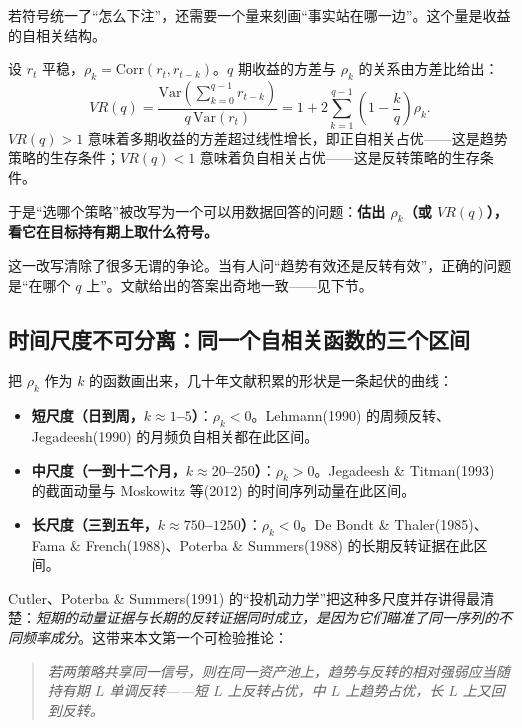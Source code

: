 若符号统一了“怎么下注”，还需要一个量来刻画“事实站在哪一边”。这个量是收益的自相关结构。

设 $r_t$ 平稳，$\rho_k=\mathrm{Corr}(r_t,r_{t-k})$。$q$ 期收益的方差与 $\rho_k$ 的关系由方差比给出\cite{lomackinlay1988,campbell1997}：
\begin{equation}
VR(q)=\frac{\mathrm{Var}\!\left(\sum_{k=0}^{q-1}r_{t-k}\right)}{q\,\mathrm{Var}(r_t)}
=1+2\sum_{k=1}^{q-1}\left(1-\frac{k}{q}\right)\rho_k .
\end{equation}
$VR(q)>1$ 意味着多期收益的方差超过线性增长，即正自相关占优——这是趋势策略的生存条件；$VR(q)<1$ 意味着负自相关占优——这是反转策略的生存条件。

于是“选哪个策略”被改写为一个可以用数据回答的问题：\textbf{估出 $\rho_k$（或 $VR(q)$），看它在目标持有期上取什么符号。}

这一改写清除了很多无谓的争论。当有人问“趋势有效还是反转有效”，正确的问题是“在哪个 $q$ 上”。文献给出的答案出奇地一致——见下节。

\subsection{时间尺度不可分离：同一个自相关函数的三个区间}

把 $\rho_k$ 作为 $k$ 的函数画出来，几十年文献积累的形状是一条起伏的曲线：

\begin{itemize}[leftmargin=2.2em]
  \item \textbf{短尺度（日到周，$k\approx1$--$5$）}：$\rho_k<0$。Lehmann(1990) 的周频反转、Jegadeesh(1990) 的月频负自相关都在此区间\cite{lehmann1990,jegadeesh1990}。
  \item \textbf{中尺度（一到十二个月，$k\approx20$--$250$）}：$\rho_k>0$。Jegadeesh \& Titman(1993) 的截面动量与 Moskowitz 等(2012) 的时间序列动量在此区间\cite{jegadeesh1993,mop2012}。
  \item \textbf{长尺度（三到五年，$k\approx750$--$1250$）}：$\rho_k<0$。De Bondt \& Thaler(1985)、Fama \& French(1988)、Poterba \& Summers(1988) 的长期反转证据在此区间\cite{debondt1985,famafrench1988,poterbsummers1988}。
\end{itemize}

Cutler、Poterba \& Summers(1991) 的“投机动力学”把这种多尺度并存讲得最清楚：\emph{短期的动量证据与长期的反转证据同时成立，是因为它们瞄准了同一序列的不同频率成分}\cite{cutler1991}。这带来本文第一个可检验推论：

\begin{quote}
\itshape
若两策略共享同一信号，则在同一资产池上，趋势与反转的相对强弱应当随持有期 $L$ 单调反转——短 $L$ 上反转占优，中 $L$ 上趋势占优，长 $L$ 上又回到反转。
\end{quote}

